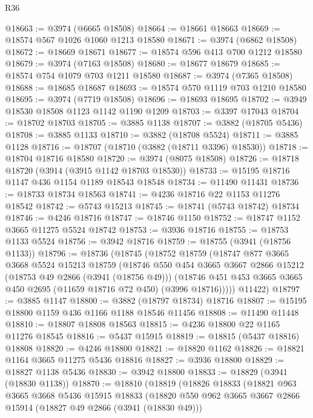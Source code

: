 \begin{lexlean}{R36}
\begin{coremodule}
@18663 := @3974 (@6665 @18508)
@18664 := @18661 @18663
@18669 := @18574 @567 @1026 @1060 @1213 @18580
@18671 := @3974 (@6862 @18508)
@18672 := @18669 @18671
@18677 := @18574 @596 @413 @700 @1212 @18580
@18679 := @3974 (@7163 @18508)
@18680 := @18677 @18679
@18685 := @18574 @754 @1079 @703 @1211 @18580
@18687 := @3974 (@7365 @18508)
@18688 := @18685 @18687
@18693 := @18574 @570 @1119 @703 @1210 @18580
@18695 := @3974 (@7719 @18508)
@18696 := @18693 @18695
@18702 := @3949 @18530 @18508 @1123 @1142 @1190 @1209
@18703 := @3397 @17043
@18704 := @18702 @18703
@18705 := @3885 @1138
@18707 := @3882 (@18705 @5436)
@18708 := @3885 @1133
@18710 := @3882 (@18708 @5524)
@18711 := @3885 @1128
@18716 := @18707 (@18710 (@3882 (@18711 @3396) @18530))
@18718 := @18704 @18716 @18580
@18720 := @3974 (@8075 @18508)
@18726 := @18718 @18720 (@3914 (@3915 @1142 @18703 @18530))
@18733 := @15195 @18716 @1147 @436 @1154 @1189 @18543 @18548
@18734 := @11490 @11431
@18736 := @18733 @18734 @18563
@18741 := @4236 @18716 @22 @1153 @11276 @18542
@18742 := @5743 @15213
@18745 := @18741 (@5743 @18742) @18734
@18746 := @4246 @18716
@18747 := @18746 @1150
@18752 := @18747 @1152 @3665 @11275 @5524 @18742
@18753 := @3936 @18716
@18755 := @18753 @1133 @5524
@18756 := @3942 @18716
@18759 := @18755 (@3941 (@18756 @1133))
@18796 := @18736
    (@18745
      (@18752
        @18759
        (@18747
          @877
          @3665
          @3668
          @5524
          @15213
          @18759
          (@18746
            @550
            @454
            @3665
            @3667
            @2866
            @15212
            (@18753 @49 @2866 (@3941 (@18756 @49)))
            (@18746 @451 @453 @3665 @3665 @450 @2695 (@11659 @18716 @72 @450) (@3996 @18716)))))
      @11422)
@18797 := @3885 @1147
@18800 := @3882 (@18797 @18734) @18716
@18807 := @15195 @18800 @1159 @436 @1166 @1188 @18546 @11456
@18808 := @11490 @11448
@18810 := @18807 @18808 @18563
@18815 := @4236 @18800 @22 @1165 @11276 @18545
@18816 := @5437 @15915
@18819 := @18815 (@5437 @18816) @18808
@18820 := @4246 @18800
@18821 := @18820 @1162
@18826 := @18821 @1164 @3665 @11275 @5436 @18816
@18827 := @3936 @18800
@18829 := @18827 @1138 @5436
@18830 := @3942 @18800
@18833 := @18829 (@3941 (@18830 @1138))
@18870 := @18810
    (@18819
      (@18826
        @18833
        (@18821
          @963
          @3665
          @3668
          @5436
          @15915
          @18833
          (@18820
            @550
            @962
            @3665
            @3667
            @2866
            @15914
            (@18827 @49 @2866 (@3941 (@18830 @49)))

\end{coremodule}
\end{lexlean}
